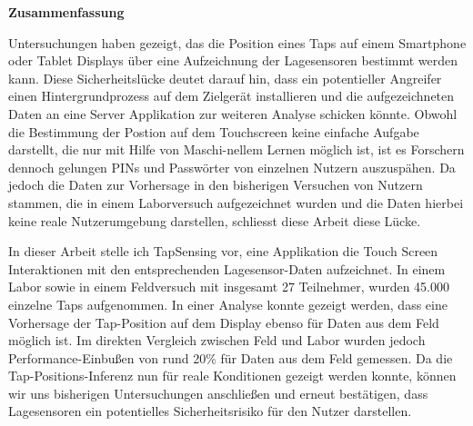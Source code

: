 \thispagestyle{empty}
\vspace*{1.2cm}

\begin{center}
    \textbf{Zusammenfassung}
\end{center}

\vspace*{0.5cm}

\noindent

Untersuchungen haben gezeigt, das die Position eines Taps auf einem Smartphone oder Tablet Displays \"uber eine Aufzeichnung der Lagesensoren bestimmt werden kann. Diese Sicherheitsl\"ucke deutet darauf hin, dass ein potentieller Angreifer einen Hintergrundprozess auf dem Zielger\"at installieren und die aufgezeichneten Daten an eine Server Applikation zur weiteren Analyse schicken k\"onnte. Obwohl die Bestimmung der Postion auf dem Touchscreen keine einfache Aufgabe darstellt, die nur mit Hilfe von Maschi-nellem Lernen m\"oglich ist, ist es Forschern dennoch gelungen PINs und Passw\"orter von einzelnen Nutzern auszusp\"ahen. Da jedoch die Daten zur Vorhersage in den bisherigen Versuchen von Nutzern stammen, die in einem Laborversuch aufgezeichnet wurden und die Daten hierbei keine reale Nutzerumgebung darstellen, schliesst diese Arbeit diese L\"ucke.

In dieser Arbeit stelle ich TapSensing vor, eine Applikation die Touch Screen Interaktionen mit den entsprechenden Lagesensor-Daten aufzeichnet. In einem Labor sowie in einem Feldversuch mit insgesamt 27 Teilnehmer, wurden 45.000 einzelne Taps aufgenommen. In einer Analyse konnte gezeigt werden, dass eine Vorhersage der Tap-Position auf dem Display ebenso f\"ur Daten aus dem Feld m\"oglich ist. Im direkten Vergleich zwischen Feld und Labor wurden jedoch Performance-Einbußen von rund 20\% f\"ur Daten aus dem Feld gemessen. Da die Tap-Positions-Inferenz nun f\"ur reale Konditionen gezeigt werden konnte, k\"onnen wir uns bisherigen Untersuchungen anschließen und erneut bestätigen, dass Lagesensoren ein potentielles Sicherheitsrisiko f\"ur den Nutzer darstellen.


